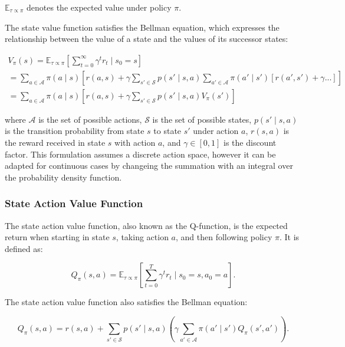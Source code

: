 $\mathbb{E}_{\tau \propto \pi}$ denotes the expected value under policy $\pi$.

The state value function satisfies the Bellman equation, which expresses the relationship between the value of a state and the values of its successor states:

\begin{equation}
    \label{bootstrap_v}
    \begin{aligned}
        V_{\pi}(s) = \mathbb{E}_{\tau \propto \pi}\left[\sum_{t=0}^{\infty} \gamma^t r_t \mid s_0 = s\right] \\
        = \sum_{a \in \mathcal{A}} \pi(a \mid s) \left[ r(a,s)  + \gamma \sum_{s' \in \mathcal{S}} p(s' \mid s,a) \sum_{a' \in \mathcal{A}} \pi(a' \mid s') \left[ r(a',s') + \gamma ...\right] \right]\\
        = \sum_{a \in \mathcal{A}} \pi(a \mid s) \left[ r(a,s) +  \gamma \sum_{s' \in \mathcal{S}} p(s' \mid s,a) V_{\pi}(s')\right]
    \end{aligned}
\end{equation}

where $\mathcal{A}$ is the set of possible actions, $\mathcal{S}$ is the set of possible states, $p(s' \mid s,a)$ is the transition probability 
from state $s$ to state $s'$ under action $a$, $r(s,a)$ is the reward received in state $s$ with action $a$, and $\gamma \in [0,1]$ is the discount factor. 
This formulation assumes a discrete action space,
however it can be adapted for continuous cases by changeing the summation with an integral over the probability density function.

\subsubsection{State Action Value Function}

The state action value function, also known as the Q-function, is the expected return when starting in state $s$, taking action $a$, and then following 
policy $\pi$. It is defined as:

\begin{equation}
    Q_{\pi}(s, a) = \mathbb{E}_{\tau \propto \pi}\left[\sum_{t=0}^T \gamma^t r_t \mid s_0 = s, a_0=a\right].
\end{equation}

The state action value function also satisfies the Bellman equation:

\begin{equation}
    \label{bmeq_q}
    Q_{\pi}(s,a) = r(s,a) + \sum_{s' \in \mathcal{S}} p(s' \mid s,a) \left(\gamma \sum_{a' \in \mathcal{A}} \pi(a' \mid s') Q_{\pi}(s',a')\right).
\end{equation}

